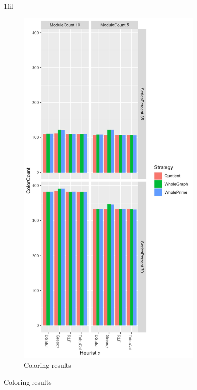 \documentclass[a4paper]{article}
\makeatletter
\newcommand*{\centerfloat}{%
  \parindent \z@
  \leftskip \z@ \@plus 1fil \@minus \textwidth
  \rightskip\leftskip
  \parfillskip \z@skip}
\makeatother
\begin{document}
\begin{figure}[p]
\centerfloat
    \begin{subfigure}{.4\paperwidth}
        \includegraphics[width=\columnwidth]{Tables/1000.png}
      \caption{Coloring results}
      \label{fig:1000c}

\end{subfigure}
\end{figure}
\end{document}
